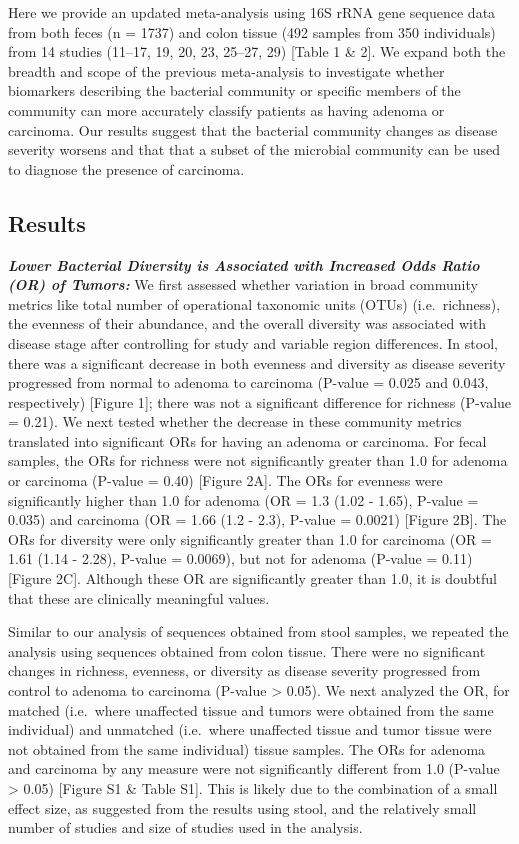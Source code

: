 \documentclass[12pt,]{article}
\begin{document}
Here we provide an updated meta-analysis using 16S rRNA gene sequence
data from both feces (n = 1737) and colon tissue (492 samples from 350
individuals) from 14 studies (11--17, 19, 20, 23, 25--27, 29) {[}Table 1
\& 2{]}. We expand both the breadth and scope of the previous
meta-analysis to investigate whether biomarkers describing the bacterial
community or specific members of the community can more accurately
classify patients as having adenoma or carcinoma. Our results suggest
that the bacterial community changes as disease severity worsens and
that that a subset of the microbial community can be used to diagnose
the presence of carcinoma.

\newpage

\subsection{Results}\label{results}

\textbf{\emph{Lower Bacterial Diversity is Associated with Increased
Odds Ratio (OR) of Tumors:}} We first assessed whether variation in
broad community metrics like total number of operational taxonomic units
(OTUs) (i.e.~richness), the evenness of their abundance, and the overall
diversity was associated with disease stage after controlling for study
and variable region differences. In stool, there was a significant
decrease in both evenness and diversity as disease severity progressed
from normal to adenoma to carcinoma (P-value = 0.025 and 0.043,
respectively) {[}Figure 1{]}; there was not a significant difference for
richness (P-value = 0.21). We next tested whether the decrease in these
community metrics translated into significant ORs for having an adenoma
or carcinoma. For fecal samples, the ORs for richness were not
significantly greater than 1.0 for adenoma or carcinoma (P-value = 0.40)
{[}Figure 2A{]}. The ORs for evenness were significantly higher than 1.0
for adenoma (OR = 1.3 (1.02 - 1.65), P-value = 0.035) and carcinoma (OR
= 1.66 (1.2 - 2.3), P-value = 0.0021) {[}Figure 2B{]}. The ORs for
diversity were only significantly greater than 1.0 for carcinoma (OR =
1.61 (1.14 - 2.28), P-value = 0.0069), but not for adenoma (P-value =
0.11) {[}Figure 2C{]}. Although these OR are significantly greater than
1.0, it is doubtful that these are clinically meaningful values.

Similar to our analysis of sequences obtained from stool samples, we
repeated the analysis using sequences obtained from colon tissue. There
were no significant changes in richness, evenness, or diversity as
disease severity progressed from control to adenoma to carcinoma
(P-value \textgreater{} 0.05). We next analyzed the OR, for matched
(i.e.~where unaffected tissue and tumors were obtained from the same
individual) and unmatched (i.e.~where unaffected tissue and tumor tissue
were not obtained from the same individual) tissue samples. The ORs for
adenoma and carcinoma by any measure were not significantly different
from 1.0 (P-value \textgreater{} 0.05) {[}Figure S1 \& Table S1{]}. This
is likely due to the combination of a small effect size, as suggested
from the results using stool, and the relatively small number of studies
and size of studies used in the analysis.
\end{document}
